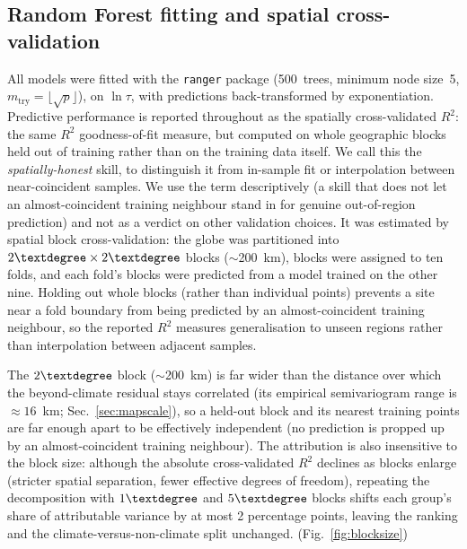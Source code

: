 \documentclass[12pt, a4paper]{article}
\begin{document}
\subsection{Random Forest fitting and spatial cross-validation}
\label{sec:rf}
All models were fitted with the \texttt{ranger} package \citep{Wright2017}
(500~trees, minimum node size~5, $m_\text{try}=\lfloor\sqrt{p}\rfloor$), on
$\ln\tau$, with predictions back-transformed by exponentiation. Predictive
performance is reported throughout as the spatially cross-validated $R^2$: the
same $R^2$ goodness-of-fit measure, but computed on whole geographic blocks held
out of training rather than on the training data itself. We call this the
\emph{spatially-honest} skill, to distinguish it from in-sample fit or
interpolation between near-coincident samples. We use the term descriptively (a skill that
does not let an almost-coincident training neighbour stand in for genuine
out-of-region prediction) and not as a verdict on other validation choices.
It was estimated by spatial block cross-validation: the globe was partitioned into
$2\textdegree\times2\textdegree$ blocks ($\sim$200~km), blocks were assigned to ten
folds, and each fold's blocks were predicted from a model trained on the other
nine. Holding out whole blocks (rather than individual points) prevents a
site near a fold boundary from being predicted by an almost-coincident training
neighbour, so the reported $R^2$ measures generalisation to unseen regions rather
than interpolation between adjacent samples.

The $2\textdegree$ block ($\sim$200~km) is far wider than the distance over
which the beyond-climate residual stays correlated (its
empirical semivariogram range is $\approx16$~km; Sec.~\ref{sec:mapscale}), so a
held-out block and its nearest training points are far enough apart to be
effectively independent (no prediction is propped up by an
almost-coincident training neighbour). The attribution
is also insensitive to the block size: although the absolute cross-validated $R^2$
declines as blocks enlarge (stricter spatial separation, fewer effective degrees
of freedom), repeating the decomposition with $1\textdegree$ and $5\textdegree$
blocks shifts each group's share of attributable
variance by at most 2 percentage points, leaving the ranking and the
climate-versus-non-climate split unchanged. (Fig.~\ref{fig:blocksize})

\end{document}
